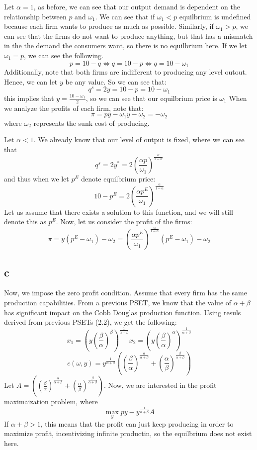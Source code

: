 \documentclass[11pt]{article}
\begin{document}
Let $\alpha = 1$, as before, we can see that our output demand is dependent on the relationship between $p$ and $\omega_1$. We can see that if $\omega_1 < p$ equilbrium is undefined because each firm wants to produce as much as possible. Similarly, if $\omega_1 > p$, we can see that the firms do not want to produce anything, but that has a mismatch in the the demand the consumers want, so there is no equilbrium here. If we let $\omega_1 = p$, we can see the following. 
\[
p = 10 - q \iff q = 10 - p \iff q = 10 - \omega_1
\]
Additionally, note that both firms are indifferent to producing any level outout. Hence, we can let $y$ be any value. So we can see that:
\[
q^s = 2y = 10 - p = 10 - \omega_1
\]
this implies that $y = \frac{10 - \omega_1}{2}$, so we can see that our equilbrium price is $\omega_1$ When we analyze the profits of each firm, note that:
\[
\pi = py - \omega_1 y - \omega_2 = - \omega_2
\]
where $\omega_2$ represents the sunk cost of producing. 


Let $\alpha < 1$. We already know that our level of output is fixed, where we can see that 
\[
q^s = 2y^* = 2 \left( \frac{\alpha p}{\omega_1} \right)^\frac{\alpha}{1-\alpha}
\]
and thus when we let $p^E$ denote equilbrium price:
\[
10 - p^E = 2 \left( \frac{\alpha p^E}{\omega_1} \right)^\frac{\alpha}{1-\alpha}
\]
Let us assume that there exists a solution to this function, and we will still denote this as $p^E$. Now, let us consider the profit of the firms:
\[
\pi = y(p^E - \omega_1) - \omega_2 = \left( \frac{\alpha p^E}{\omega_1} \right)^\frac{\alpha}{1-\alpha} ( p^E - \omega_1) - \omega_2
\]
\subsection*{c}
Now, we impose the zero profit condition. Assume that every firm has the same production capabilities. From a previous PSET, we know that the value of $\alpha + \beta$ has significant impact on the Cobb Douglas production function. Using resuls derived from previous PSETs (2.2), we get the following:
\[
x_1 = \left( y \left( \frac{\beta}{\alpha} \right)^\beta \right)^\frac{1}{\alpha + \beta} x_2 = \left( y \left( \frac{\beta}{\alpha} \right)^\alpha \right)^\frac{1}{\alpha + \beta}
\] 
\[
c(\omega, y) = y^\frac{1}{\alpha + \beta} \left( \left( \frac{\beta}{\alpha} \right)^\frac{\alpha}{\alpha + \beta} + \left( \frac{\alpha}{\beta} \right)^\frac{\beta}{\alpha + \beta} \right)
\]
Let $A =  \left( \left( \frac{\beta}{\alpha} \right)^\frac{\alpha}{\alpha + \beta} + \left( \frac{\alpha}{\beta} \right)^\frac{\beta}{\alpha + \beta} \right)$. Now, we are interested in the profit maximaization problem, where 
\[
\max_y py - y^\frac{1}{\alpha + \beta} A
\]
If $\alpha + \beta > 1$, this means that the profit can just keep producing in order to maximize profit, incentivizing infinite productin, so the equilbrium does not exist here. \\
\end{document}
